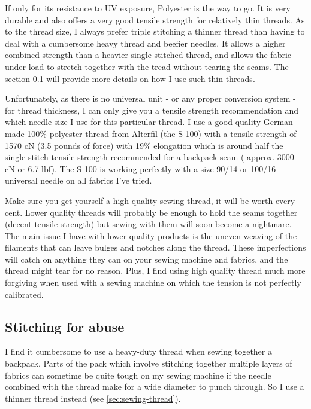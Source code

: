 If only for its resistance to UV exposure, Polyester is the way to go. It is very durable and also offers a very good tensile strength for relatively thin threads. As to the thread size, I always prefer triple stitching a thinner thread than having to deal with a cumbersome heavy thread and beefier needles. It allows a higher combined strength than a heavier single-stitched thread, and allows the fabric under load to stretch together with the tread without tearing the seams. The section \ref{sec:stitching-for-abuse} will provide more details on how I use such thin threads.

Unfortunately, as there is no universal unit - or any proper conversion system - for thread thickness, I can only give you a tensile strength recommendation and which needle size I use for this particular thread. I use a good quality German-made 100\% polyester thread from Alterfil (the S-100) with a tensile strength of 1570 cN (3.5 pounds of force) with 19\% elongation which is around half the single-stitch tensile strength recommended for a backpack seam ( approx. 3000 cN or 6.7 lbf). The S-100 is working perfectly with a size 90/14 or 100/16 universal needle on all fabrics I've tried.



Make sure you get yourself a high quality sewing thread, it will be worth every cent. Lower quality threads will probably be enough to hold the seams together (decent tensile strength) but sewing with them will soon become a nightmare. The main issue I have with lower quality products is the uneven weaving of the filaments that can leave bulges and notches along the thread. These imperfections will catch on anything they can on your sewing machine and fabrics, and the thread might tear for no reason. Plus, I find using high quality thread much more forgiving when used with a sewing machine on which the tension is not perfectly calibrated.

\subsection{Stitching for abuse} \label{sec:stitching-for-abuse}

I find it cumbersome to use a heavy-duty thread when sewing together a backpack. Parts of the pack which involve stitching together multiple layers of fabrics can sometime be quite tough on my sewing machine if the needle combined with the thread make for a wide diameter to punch through. So I use a thinner thread instead (see \ref{sec:sewing-thread}).

